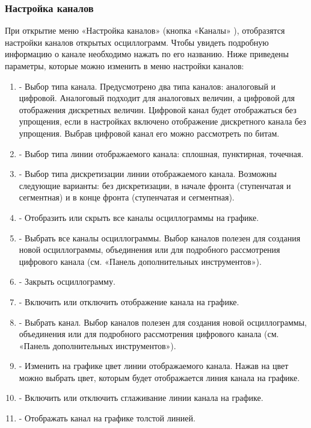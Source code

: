 \documentclass[a4paper,12pt]{article}
\begin{document}
 
\subsubsection*{\hspace{.5cm} Настройка каналов } 
\hspace{.5cm}При открытие меню «Настройка каналов» (кнопка «Каналы» ), отобразятся настройки каналов открытых осциллограмм. Чтобы увидеть подробную информацию о канале необходимо нажать по его названию. Ниже приведены параметры, которые можно изменить в меню настройки каналов: 
\begin{enumerate} 
\item - Выбор типа канала. Предусмотрено два типа каналов: аналоговый и цифровой. Аналоговый подходит для аналоговых величин, а цифровой для отображения дискретных величин. Цифровой канал будет отображаться без упрощения, если в настройках включено отображение дискретного канала без упрощения. Выбрав цифровой канал его можно рассмотреть по битам.  
\item - Выбор типа линии отображаемого канала: сплошная, пунктирная, точечная. 
\item - Выбор типа дискретизации линии отображаемого канала. Возможны следующие варианты: без дискретизации, в начале фронта (ступенчатая и сегментная) и в конце фронта (ступенчатая и сегментная). 
\item - Отобразить или скрыть все каналы осциллограммы на графике. 
\item - Выбрать все каналы осциллограммы. Выбор каналов полезен для создания новой осциллограммы, объединения или для подробного рассмотрения цифрового канала (см. «Панель дополнительных инструментов»). 
\item - Закрыть осциллограмму. 
\item - Включить или отключить отображение канала на графике.  
\item - Выбрать канал. Выбор каналов полезен для создания новой осциллограммы, объединения или для подробного рассмотрения цифрового канала (см. «Панель дополнительных инструментов»). 
\item - Изменить на графике цвет линии отображаемого канала. Нажав на цвет можно выбрать цвет, которым будет отображается линия канала на графике. 
\item - Включить или отключить сглаживание линии канала на графике. 
\item - Отображать канал на графике толстой линией. 
\end {enumerate} 
 
\end{document}
